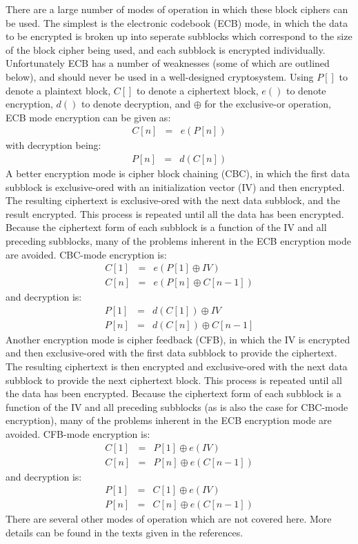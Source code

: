 There are a large number of modes of operation in which these block ciphers can
be used.  The simplest is the electronic codebook (ECB) mode, in which the data
to be encrypted is broken up into seperate subblocks which correspond to the
size of the block cipher being used, and each subblock is encrypted
individually.  Unfortunately ECB has a number of weaknesses (some of which are
outlined below), and should never be used in a well-designed cryptosystem.
Using $P[]$ to denote a plaintext block, $C[]$ to denote a ciphertext block, $e()$ to
denote encryption, $d()$ to denote decryption, and $\oplus$ for the exclusive-or
operation, ECB mode encryption can be given as:
\begin{eqnarray*}
    C[ n ] & = & e( P[ n ] )
\end{eqnarray*}
with decryption being:
\begin{eqnarray*}
    P[ n ] & = & d( C[ n ] )
\end{eqnarray*}
A better encryption mode is cipher block chaining (CBC), in which the first
data subblock is exclusive-ored with an initialization vector (IV) and then
encrypted.  The resulting ciphertext is exclusive-ored with the next data
subblock, and the result encrypted.  This process is repeated until all the
data has been encrypted.  Because the ciphertext form of each subblock is a
function of the IV and all preceding subblocks, many of the problems inherent
in the ECB encryption mode are avoided.  CBC-mode encryption is:
\begin{eqnarray*}
    C[ 1 ] & = & e( P[ 1 ] \oplus IV )\\
    C[ n ] & = & e( P[ n ] \oplus C[ n-1 ] )
\end{eqnarray*}
and decryption is:
\begin{eqnarray*}
    P[ 1 ] & = & d( C[ 1 ] ) \oplus IV\\
    P[ n ] & = & d( C[ n ] ) \oplus C[ n-1 ]
\end{eqnarray*}
Another encryption mode is cipher feedback (CFB), in which the IV is encrypted
and then exclusive-ored with the first data subblock to provide the ciphertext.
The resulting ciphertext is then encrypted and exclusive-ored with the next
data subblock to provide the next ciphertext block.  This process is repeated
until all the data has been encrypted.  Because the ciphertext form of each
subblock is a function of the IV and all preceding subblocks (as is also the
case for CBC-mode encryption), many of the problems inherent in the ECB
encryption mode are avoided.  CFB-mode encryption is:
\begin{eqnarray*}
   C[ 1 ] & = & P[ 1 ] \oplus e( IV )\\
   C[ n ] & = & P[ n ] \oplus e( C[ n-1 ] )
\end{eqnarray*}
and decryption is:
\begin{eqnarray*}
    P[ 1 ] & = & C[ 1 ] \oplus e( IV )\\
    P[ n ] & = & C[ n ] \oplus e( C[ n-1 ] )
\end{eqnarray*}
There are several other modes of operation which are not covered here.  More
details can be found in the texts given in the references.

